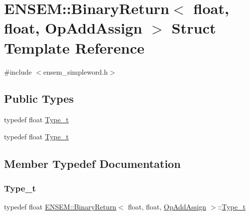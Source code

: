 \hypertarget{structENSEM_1_1BinaryReturn_3_01float_00_01float_00_01OpAddAssign_01_4}{}\section{E\+N\+S\+EM\+:\+:Binary\+Return$<$ float, float, Op\+Add\+Assign $>$ Struct Template Reference}
\label{structENSEM_1_1BinaryReturn_3_01float_00_01float_00_01OpAddAssign_01_4}


{\ttfamily \#include $<$ensem\+\_\+simpleword.\+h$>$}

\subsection*{Public Types}
\begin{DoxyCompactItemize}
\item 
typedef float \mbox{\hyperlink{structENSEM_1_1BinaryReturn_3_01float_00_01float_00_01OpAddAssign_01_4_af39f6f2b4b50fa85e57dfdabddfab31a}{Type\+\_\+t}}
\item 
typedef float \mbox{\hyperlink{structENSEM_1_1BinaryReturn_3_01float_00_01float_00_01OpAddAssign_01_4_af39f6f2b4b50fa85e57dfdabddfab31a}{Type\+\_\+t}}
\end{DoxyCompactItemize}


\subsection{Member Typedef Documentation}
\mbox{\label{structENSEM_1_1BinaryReturn_3_01float_00_01float_00_01OpAddAssign_01_4_af39f6f2b4b50fa85e57dfdabddfab31a}} 
\subsubsection{\texorpdfstring{Type\_t}{Type\_t}\hspace{0.1cm}{\footnotesize\ttfamily [1/2]}}
{\footnotesize\ttfamily typedef float \mbox{\hyperlink{structENSEM_1_1BinaryReturn}{E\+N\+S\+E\+M\+::\+Binary\+Return}}$<$ float, float, \mbox{\hyperlink{structENSEM_1_1OpAddAssign}{Op\+Add\+Assign}} $>$\+::\mbox{\hyperlink{structENSEM_1_1BinaryReturn_3_01float_00_01float_00_01OpAddAssign_01_4_af39f6f2b4b50fa85e57dfdabddfab31a}{Type\+\_\+t}}}

